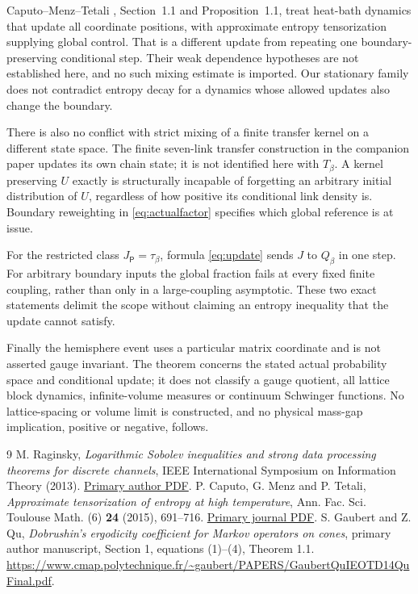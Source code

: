 \documentclass[11pt]{article}
\begin{document}
Caputo--Menz--Tetali \cite{cmt}, Section~1.1 and Proposition~1.1, treat
heat-bath dynamics that update all coordinate positions, with approximate
entropy tensorization supplying global control. That is a different update
from repeating one boundary-preserving conditional step. Their weak
dependence hypotheses are not established here, and no such mixing estimate
is imported. Our stationary family does not contradict entropy decay for
a dynamics whose allowed updates also change the boundary.

There is also no conflict with strict mixing of a finite transfer kernel
on a different state space. The finite seven-link transfer construction in
the companion paper updates its own chain state; it is not identified here
with $T_\beta$. A kernel preserving $U$ exactly is structurally incapable
of forgetting an arbitrary initial distribution of $U$, regardless of how
positive its conditional link density is. Boundary reweighting in
\eqref{eq:actualfactor} specifies which global reference is at issue.

For the restricted class $J_{\mathsf P}=\tau_\beta$, formula
\eqref{eq:update} sends $J$ to $Q_\beta$ in one step. For arbitrary boundary
inputs the global fraction fails at every fixed finite coupling, rather than
only in a large-coupling asymptotic. These two exact statements delimit the
scope without claiming an entropy inequality that the update cannot satisfy.

Finally the hemisphere event uses a particular matrix coordinate and is
not asserted gauge invariant. The theorem concerns the stated actual
probability space and conditional update; it does not classify a gauge
quotient, all lattice block dynamics, infinite-volume measures or continuum
Schwinger functions. No lattice-spacing or volume limit is constructed, and
no physical mass-gap implication, positive or negative, follows.

\begin{thebibliography}{9}
 M. Raginsky, \emph{Logarithmic Sobolev inequalities and
strong data processing theorems for discrete channels}, IEEE International
Symposium on Information Theory (2013).
\href{https://maxim.ece.illinois.edu/pubs/raginsky_ISIT13.pdf}{Primary author PDF}.
 P. Caputo, G. Menz and P. Tetali,
\emph{Approximate tensorization of entropy at high temperature},
Ann. Fac. Sci. Toulouse Math. (6) \textbf{24} (2015), 691--716.
\href{https://www.numdam.org/item/AFST_2015_6_24_4_691_0.pdf}{Primary journal PDF}.
 S. Gaubert and Z. Qu,
\emph{Dobrushin's ergodicity coefficient for Markov operators on cones},
primary author manuscript, Section 1, equations (1)--(4), Theorem 1.1.
\url{https://www.cmap.polytechnique.fr/~gaubert/PAPERS/GaubertQuIEOTD14QuFinal.pdf}.
\end{thebibliography}
\end{document}
